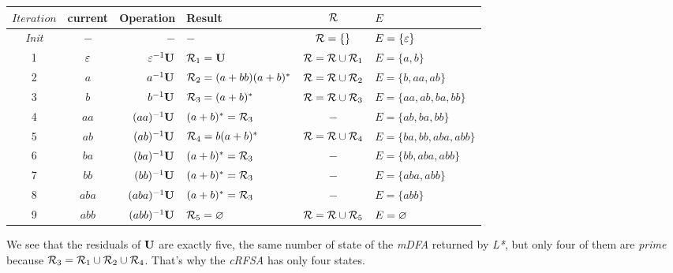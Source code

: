 \begin{tabular}{c|c|r|l|c|l}
  $Iteration$   & current & Operation      & Result                  & $\mathcal{R}$                  & $E$                        \\
  \hline\hline
  \textit{Init} & $-$     & $-$            & $-$                     & $\mathcal{R} = \{\}$           & $E = \{\varepsilon\}$               \\
  1             & $\varepsilon$    & $\varepsilon^{-1}\mathbf{U}$    & $\mathcal{R}_1 = \mathbf{U}$            & $\mathcal{R} = \mathcal{R} \cup \mathcal{R}_1$ & $E = \{a, b\}$             \\
  2             & $a$     & $a^{-1}\mathbf{U}$     & $\mathcal{R}_2 = (a+bb)(a+b)^*$ & $\mathcal{R} = \mathcal{R} \cup \mathcal{R}_2$ & $E = \{b, aa, ab\}$        \\
  3             & $b$     & $b^{-1}\mathbf{U}$     & $\mathcal{R}_3 = (a+b)^*$       & $\mathcal{R} = \mathcal{R} \cup \mathcal{R}_3$ & $E = \{aa, ab, ba, bb\}$   \\
  4             & $aa$    & $(aa)^{-1}\mathbf{U}$  & $(a+b)^* = \mathcal{R}_3$       & $-$                    & $E = \{ab, ba, bb\}$       \\
  5             & $ab$    & $(ab)^{-1}\mathbf{U}$  & $\mathcal{R}_4 = b(a+b)^*$      & $\mathcal{R} = \mathcal{R} \cup \mathcal{R}_4$ & $E = \{ba, bb, aba, abb\}$ \\
  6             & $ba$    & $(ba)^{-1}\mathbf{U}$  & $(a+b)^* = \mathcal{R}_3$       & $-$                    & $E = \{bb, aba, abb\}$     \\
  7             & $bb$    & $(bb)^{-1}\mathbf{U}$  & $(a+b)^* = \mathcal{R}_3$       & $-$                    & $E = \{aba, abb\}$         \\
  8             & $aba$   & $(aba)^{-1}\mathbf{U}$ & $(a+b)^* = \mathcal{R}_3$       & $-$                    & $E = \{abb\}$              \\
  9             & $abb$   & $(abb)^{-1}\mathbf{U}$ & $\mathcal{R}_5 = \varnothing$           & $\mathcal{R} = \mathcal{R} \cup \mathcal{R}_5$ & $E = \varnothing$                  \\
\end{tabular}

We see that the residuals of $\mathbf{U}$ are exactly five, the same number of state of the \textit{mDFA} returned by \textit{L*}, but only four of them are \textit{prime} because $\mathcal{R}_3 = \mathcal{R}_1 \cup \mathcal{R}_2 \cup \mathcal{R}_4$. That's why the \textit{cRFSA} has only four states.